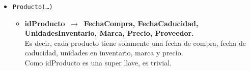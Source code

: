 \documentclass{article}
\newcommand{\flecha}{$\,\to\,$ }
\begin{document}
\begin{itemize}
\item \texttt{Producto(\ldots)}
	\begin{itemize}
		\item \textbf{idProducto \flecha FechaCompra, FechaCaducidad, UnidadesInventario, Marca, Precio, Proveedor.}\\
		Es decir, cada producto tiene solamente una fecha de compra, fecha de caducidad, unidades en inventario, marca y precio.\\
		Como idProducto es una super llave, es trivial.
	\end{itemize}

\end{itemize}
\end{document}
